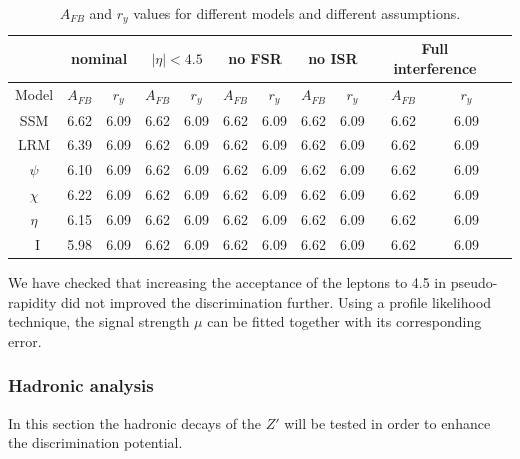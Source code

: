\begin{table}
\centering
\begin{tabular}{| c | c | c | c | c | c | c | c | c | c | c | c |} \hline\hline
 & \multicolumn{2}{c|}{nominal}  & \multicolumn{2}{c|}{$|\eta|<4.5$} & \multicolumn{2}{c|}{no FSR} & \multicolumn{2}{c|}{no ISR} & \multicolumn{2}{c|}{Full interference}\\

\hline
  Model &  $A_{FB}$   &  $r_y$   &  $A_{FB}$   &  $r_y$&  $A_{FB}$   &  $r_y$&  $A_{FB}$   &  $r_y$&  $A_{FB}$   &  $r_y$ \\
\hline
SSM    &     6.62     &  6.09   &     6.62     &  6.09&     6.62     &  6.09&     6.62     &  6.09&     6.62     &  6.09      \\
LRM    &   6.39       &  6.09   &     6.62     &  6.09&     6.62     &  6.09&     6.62     &  6.09&     6.62     &  6.09 \\
$\psi$    &  6.10   &  6.09   &     6.62     &  6.09&     6.62     &  6.09&     6.62     &  6.09&     6.62     &  6.09   \\
$\chi$   &  6.22    &  6.09   &     6.62     &  6.09&     6.62     &  6.09&     6.62     &  6.09&     6.62     &  6.09    \\
$\eta$   &  6.15     &  6.09   &     6.62     &  6.09&     6.62     &  6.09&     6.62     &  6.09&     6.62     &  6.09    \\
~I        & 5.98   &  6.09   &     6.62     &  6.09&     6.62     &  6.09&     6.62     &  6.09&     6.62     &  6.09   \\
\hline\hline
\end{tabular}
\caption{$A_{FB}$ and $r_y$ values for different models and different assumptions.}
\label{tab:leptonicresonances:comp}
\end{table}

We have checked that increasing the acceptance of the leptons to 4.5 in pseudo-rapidity did not improved the discrimination further. 
Using a profile likelihood technique, the signal strength $\mu$ can be fitted together with its corresponding error. 


\subsubsection{Hadronic analysis}
\label{subsection:hadana}
In this section the hadronic decays of the $Z'$ will be tested in order to enhance the discrimination potential. 


